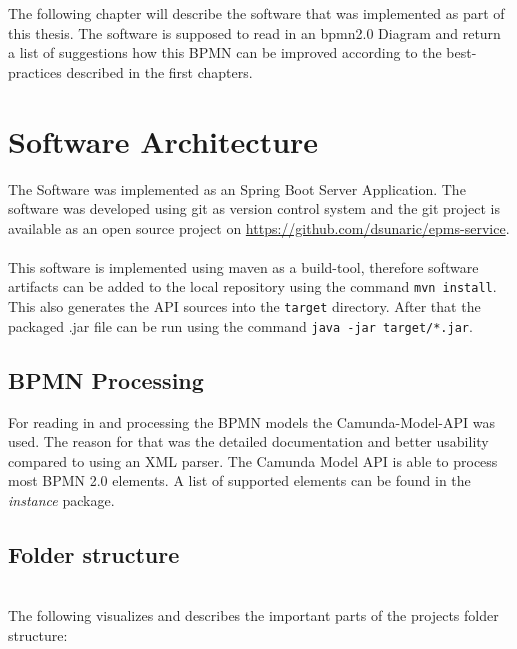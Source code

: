 The following chapter will describe the software that was implemented as part of this thesis. The software is supposed to read in an \gls{bpmn}2.0 Diagram and return a list of suggestions how this BPMN can be improved according to the best-practices described in the first chapters.
\section{Software Architecture}
The Software was implemented as an Spring Boot Server\cite{spring-boot} Application. The software was developed using git\cite{git} as version control system and the git project is available as an open source project on \url{https://github.com/dsunaric/epms-service}.\\~\\

This software is implemented using maven\cite{maven} as a build-tool, therefore software artifacts can be added to the local repository using the command \verb|mvn install|. This also generates the API sources into the \verb|target| directory. After that the packaged .jar file can be run using the command \verb|java -jar target/*.jar|. 


\subsection{BPMN Processing}
For reading in and processing the BPMN models the Camunda-Model-API\cite{camunda-model-api} was used. The reason for that was the detailed documentation and better usability compared to using an XML parser. The Camunda Model API is able to process most BPMN 2.0 elements. A list of supported elements can be found in the \textit{instance} package\cite{camunda-model-api-spoorted-elements}.
\newpage
\subsection{Folder structure}~\\
The following visualizes and describes the important parts of the projects folder structure:

